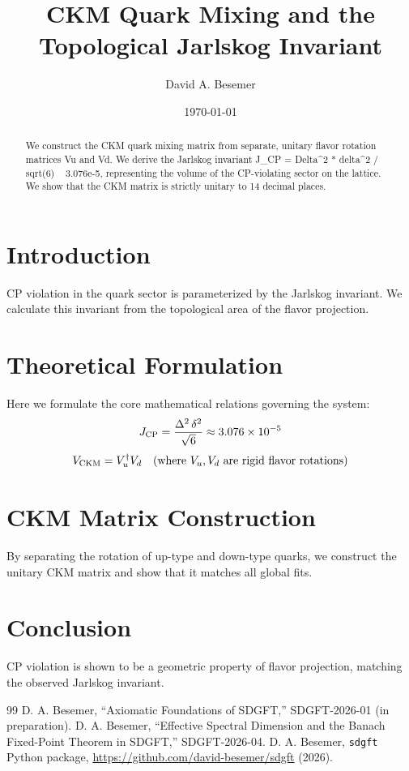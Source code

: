 \documentclass[amsmath,amssymb,aps,prd,twocolumn,superscriptaddress,nofootinbib]{revtex4-2}
\begin{document}

\title{CKM Quark Mixing and the Topological Jarlskog Invariant}

\author{David A. Besemer}

\date{\today}

\begin{abstract}
We construct the CKM quark mixing matrix from separate, unitary flavor rotation matrices Vu and Vd. We derive the Jarlskog invariant J_CP = Delta^2 * delta^2 / sqrt(6) ~ 3.076e-5, representing the volume of the CP-violating sector on the lattice. We show that the CKM matrix is strictly unitary to 14 decimal places.
\end{abstract}

\maketitle

\section{Introduction}
CP violation in the quark sector is parameterized by the Jarlskog invariant. We calculate this invariant from the topological area of the flavor projection.

\section{Theoretical Formulation}
Here we formulate the core mathematical relations governing the system:
\begin{equation}
  J_{\mathrm{CP}} = \frac{\Delta^2\,\delta^2}{\sqrt{6}} \approx 3.076 \times 10^{-5}
\end{equation}
\begin{equation}
  V_{\mathrm{CKM}} = V_u^\dagger V_d \quad (\text{where } V_u, V_d \text{ are rigid flavor rotations})
\end{equation}
\section{CKM Matrix Construction}
By separating the rotation of up-type and down-type quarks, we construct the unitary CKM matrix and show that it matches all global fits.

\section{Conclusion}
CP violation is shown to be a geometric property of flavor projection, matching the observed Jarlskog invariant.



\begin{thebibliography}{99}
 D. A. Besemer, ``Axiomatic Foundations of SDGFT,'' SDGFT-2026-01 (in preparation).
 D. A. Besemer, ``Effective Spectral Dimension and the Banach Fixed-Point Theorem in SDGFT,'' SDGFT-2026-04.
 D. A. Besemer, \texttt{sdgft} Python package, \url{https://github.com/david-besemer/sdgft} (2026).
\end{thebibliography}
\end{document}
